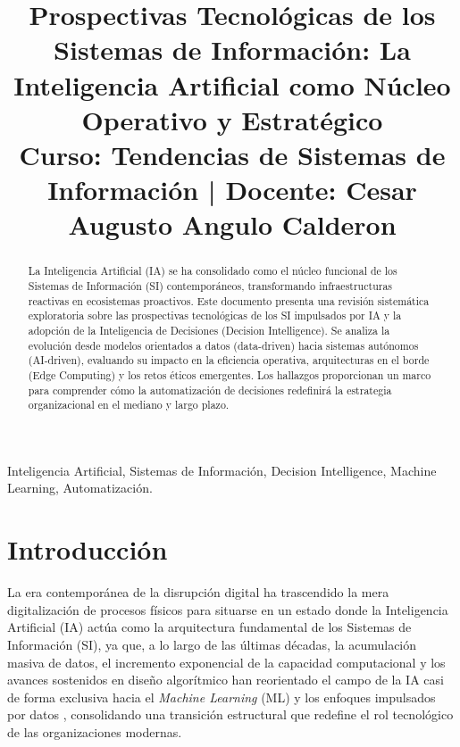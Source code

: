 \documentclass[conference]{IEEEtran}
\begin{document}
\title{Prospectivas Tecnológicas de los Sistemas de Información: La Inteligencia Artificial como Núcleo Operativo y Estratégico\\
{\footnotesize Curso: Tendencias de Sistemas de Información | Docente: Cesar Augusto Angulo Calderon}
}

\author{
}

\maketitle

\begin{abstract}
La Inteligencia Artificial (IA) se ha consolidado como el núcleo funcional de los Sistemas de Información (SI) contemporáneos, transformando infraestructuras reactivas en ecosistemas proactivos. Este documento presenta una revisión sistemática exploratoria sobre las prospectivas tecnológicas de los SI impulsados por IA y la adopción de la Inteligencia de Decisiones (Decision Intelligence). Se analiza la evolución desde modelos orientados a datos (data-driven) hacia sistemas autónomos (AI-driven), evaluando su impacto en la eficiencia operativa, arquitecturas en el borde (Edge Computing) y los retos éticos emergentes. Los hallazgos proporcionan un marco para comprender cómo la automatización de decisiones redefinirá la estrategia organizacional en el mediano y largo plazo.
\end{abstract}

\begin{IEEEkeywords}
Inteligencia Artificial, Sistemas de Información, Decision Intelligence, Machine Learning, Automatización.
\end{IEEEkeywords}

\section{Introducción}
 
La era contemporánea de la disrupción digital ha trascendido la mera digitalización de procesos físicos para situarse en un estado donde la Inteligencia Artificial (IA) actúa como la arquitectura fundamental de los Sistemas de Información (SI), ya que, a lo largo de las últimas décadas, la acumulación masiva de datos, el incremento exponencial de la capacidad computacional y los avances sostenidos en diseño algorítmico han reorientado el campo de la IA casi de forma exclusiva hacia el \textit{Machine Learning} (ML) y los enfoques impulsados por datos \cite{storey2025genai}, consolidando una transición estructural que redefine el rol tecnológico de las organizaciones modernas.
 
\end{document}
